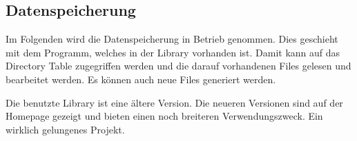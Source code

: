 \newpage
\subsection{Datenspeicherung}
\label{sec:Inbetriebnahme_Datenspeicherung}

Im Folgenden wird die Datenspeicherung in Betrieb genommen. Dies geschieht mit dem Programm, welches in der Library vorhanden ist. Damit kann auf das Directory Table zugegriffen werden und die darauf vorhandenen Files gelesen und bearbeitet werden. Es können auch neue Files generiert werden.

Die benutzte Library ist eine ältere Version. Die neueren Versionen sind auf der Homepage gezeigt und bieten einen noch breiteren Verwendungszweck. Ein wirklich gelungenes Projekt. \cite{dharmani_sdsdhc_2009}